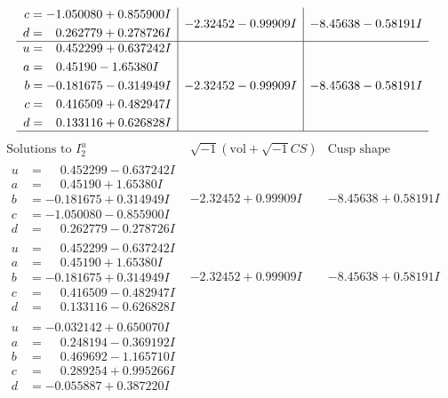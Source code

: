 \documentclass[1p]{elsarticle_modified}
\theoremstyle{definition}
\newcommand{\I}{\sqrt{-1}}
\begin{document}
$$\begin{array}{c|c|c}
\begin{aligned}
c &= -1.050080 + 0.855900 I \\
d &= \phantom{-}0.262779 + 0.278726 I\end{aligned}
 & -2.32452 - 0.99909 I & -8.45638 - 0.58191 I \\ \hline\begin{aligned}
u &= \phantom{-}0.452299 + 0.637242 I \\
a &= \phantom{-}0.45190 - 1.65380 I \\
b &= -0.181675 - 0.314949 I \\
c &= \phantom{-}0.416509 + 0.482947 I \\
d &= \phantom{-}0.133116 + 0.626828 I\end{aligned}
 & -2.32452 - 0.99909 I & -8.45638 - 0.58191 I\\
 \hline 
 \end{array}$$\newpage$$\begin{array}{c|c|c}  
\text{Solutions to }I^u_{2}& \I (\text{vol} + \sqrt{-1}CS) & \text{Cusp shape}\\
 \hline 
\begin{aligned}
u &= \phantom{-}0.452299 - 0.637242 I \\
a &= \phantom{-}0.45190 + 1.65380 I \\
b &= -0.181675 + 0.314949 I \\
c &= -1.050080 - 0.855900 I \\
d &= \phantom{-}0.262779 - 0.278726 I\end{aligned}
 & -2.32452 + 0.99909 I & -8.45638 + 0.58191 I \\ \hline\begin{aligned}
u &= \phantom{-}0.452299 - 0.637242 I \\
a &= \phantom{-}0.45190 + 1.65380 I \\
b &= -0.181675 + 0.314949 I \\
c &= \phantom{-}0.416509 - 0.482947 I \\
d &= \phantom{-}0.133116 - 0.626828 I\end{aligned}
 & -2.32452 + 0.99909 I & -8.45638 + 0.58191 I \\ \hline\begin{aligned}
u &= -0.032142 + 0.650070 I \\
a &= \phantom{-}0.248194 - 0.369192 I \\
b &= \phantom{-}0.469692 - 1.165710 I \\
c &= \phantom{-}0.289254 + 0.995266 I \\
d &= -0.055887 + 0.387220 I\end{aligned}

\end{array}$$
\end{document}
